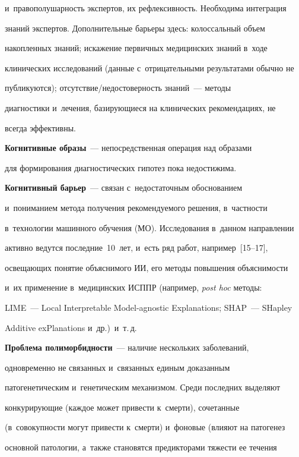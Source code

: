 и~правополушарность экспертов, их рефлексивность. Необходима интеграция 

знаний экспертов. Дополнительные барьеры здесь: колоссальный объем 

накопленных знаний; искажение первичных медицинских знаний в~ходе 

клинических исследований (данные с~отрицательными результатами обычно не 

публикуются); от\-сут\-ст\-вие\!/\!не\-до\-сто\-вер\-ность знаний~--- методы 

диагностики и~лечения, базирующиеся на клинических рекомендациях, не 

всегда эффективны.

  

  \textbf{Когнитивные образы}~--- непосредственная операция над образами 

для формирования диагностических гипотез пока недостижима.

  

  \textbf{Когнитивный барьер}~--- связан с~недостаточным обоснованием 

и~пониманием метода получения рекомендуемого решения, в~частности 

в~технологии машинного обуче\-ния (МО). Исследования в~данном направлении 

активно ведутся последние~10~лет, и~есть ряд работ, например~[15--17], 

осве\-ща\-ющих понятие объяснимого ИИ, его методы повышения объяснимости 

и~их применение в~медицинских ИСППР (например, \textit{post hoc} методы: 

LIME~--- Local Interpretable Model-agnostic Explanations; SHAP~--- SHapley 

Additive exPlanations и~др.)\ и~т.\,д.



\pagebreak

  

  \textbf{Проблема полиморбидности}~--- наличие нескольких заболеваний, 

одновременно не связанных и~связанных единым доказанным 

патогенетическим и~генетическим механизмом. Среди последних выделяют 

конкурирующие (каждое может привести к~смерти), сочетанные 

(в~совокупности могут привести к~смерти) и~фоновые (влияют на патогенез 

основной патологии, а~также становятся предикторами тяжести ее течения 

